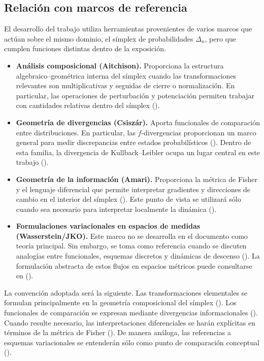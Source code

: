 ﻿\documentclass[12pt]{article}
\begin{document}
\subsection*{Relación con marcos de referencia}

El desarrollo del trabajo utiliza herramientas provenientes de varios marcos que actúan sobre el mismo dominio, el símplex de probabilidades $\Delta_n$, pero que cumplen funciones distintas dentro de la exposición.

\begin{itemize}
    \item \textbf{Análisis composicional (Aitchison).} Proporciona la estructura algebraico--geométrica interna del símplex cuando las transformaciones relevantes son multiplicativas y seguidas de cierre o normalización. En particular, las operaciones de perturbación y potenciación permiten trabajar con cantidades relativas dentro del símplex (\cite{Aitchison1986}).

    \item \textbf{Geometría de divergencias (Csiszár).} Aporta funcionales de comparación entre distribuciones. En particular, las $f$-divergencias proporcionan un marco general para medir discrepancias entre estados probabilísticos (\cite{Csiszar1975}). Dentro de esta familia, la divergencia de Kullback--Leibler ocupa un lugar central en este trabajo (\cite{KullbackLeibler1951}).

    \item \textbf{Geometría de la información (Amari).} Proporciona la métrica de Fisher y el lenguaje diferencial que permite interpretar gradientes y direcciones de cambio en el interior del símplex (\cite{AmariNagaoka2000}). Este punto de vista se utilizará sólo cuando sea necesario para interpretar localmente la dinámica (\cite{Amari2016}).

    \item \textbf{Formulaciones variacionales en espacios de medidas (Wasserstein/JKO).} Este marco no se desarrolla en el documento como teoría principal. Sin embargo, se toma como referencia cuando se discuten analogías entre funcionales, esquemas discretos y dinámicas de descenso (\cite{JordanKinderlehrerOtto1998}). La formulación abstracta de estos flujos en espacios métricos puede consultarse en (\cite{AmbrosioGigliSavare2005}).
\end{itemize}

La convención adoptada será la siguiente. Las transformaciones elementales se formulan principalmente en la geometría composicional del símplex (\cite{Aitchison1986}). Los funcionales de comparación se expresan mediante divergencias informacionales (\cite{Csiszar1975}). Cuando resulte necesario, las interpretaciones diferenciales se harán explícitas en términos de la métrica de Fisher (\cite{Amari2016}). De manera análoga, las referencias a esquemas variacionales se entenderán sólo como punto de comparación conceptual (\cite{JordanKinderlehrerOtto1998}).
\end{document}
